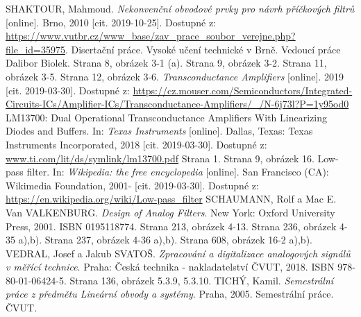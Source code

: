 \begin{thebibliography}{999}
SHAKTOUR, Mahmoud. \textit{Nekonvenční obvodové prvky pro návrh příčkových filtrů} [online]. Brno, 2010 [cit. 2019-10-25]. Dostupné z: \url{https://www.vutbr.cz/www_base/zav_prace_soubor_verejne.php?file_id=35975}. Disertační práce. Vysoké učení technické v Brně. Vedoucí práce Dalibor Biolek. Strana 8, obrázek 3-1 (a). Strana 9, obrázek 3-2. Strana 11, obrázek 3-5. Strana 12, obrázek 3-6.
\textit{Transconductance Amplifiers} [online]. 2019 [cit. 2019-03-30]. Dostupné z: \url{https://cz.mouser.com/Semiconductors/Integrated-Circuits-ICs/Amplifier-ICs/Transconductance-Amplifiers/_/N-6j73l?P=1y95od0}
LM13700: Dual Operational Transconductance Amplifiers With Linearizing Diodes and Buffers. In: \textit{Texas Instruments} [online]. Dallas, Texas: Texas Instruments Incorporated, 2018 [cit. 2019-03-30]. Dostupné z: \url{www.ti.com/lit/ds/symlink/lm13700.pdf} Strana 1. Strana 9, obrázek 16.
Low-pass filter. In: \textit{Wikipedia: the free encyclopedia} [online]. San Francisco (CA): Wikimedia Foundation, 2001- [cit. 2019-03-30]. Dostupné z: \url{https://en.wikipedia.org/wiki/Low-pass_filter}
SCHAUMANN, Rolf a Mac E. Van VALKENBURG. \textit{Design of Analog Filters}. New York: Oxford University Press, 2001. ISBN 0195118774. Strana 213, obrázek 4-13. Strana 236, obrázek 4-35 a),b). Strana 237, obrázek 4-36 a),b). Strana 608, obrázek 16-2 a),b).
VEDRAL, Josef a Jakub SVATOŠ. \textit{Zpracování a digitalizace analogových signálů v měřící technice}. Praha: Česká technika - nakladatelství ČVUT, 2018. ISBN 978-80-01-06424-5. Strana 136, obrázek 5.3.9, 5.3.10.
TICHÝ, Kamil. \textit{Semestrální práce z předmětu Lineární obvody a systémy}. Praha, 2005. Semestrální práce. ČVUT.
\end{thebibliography}
